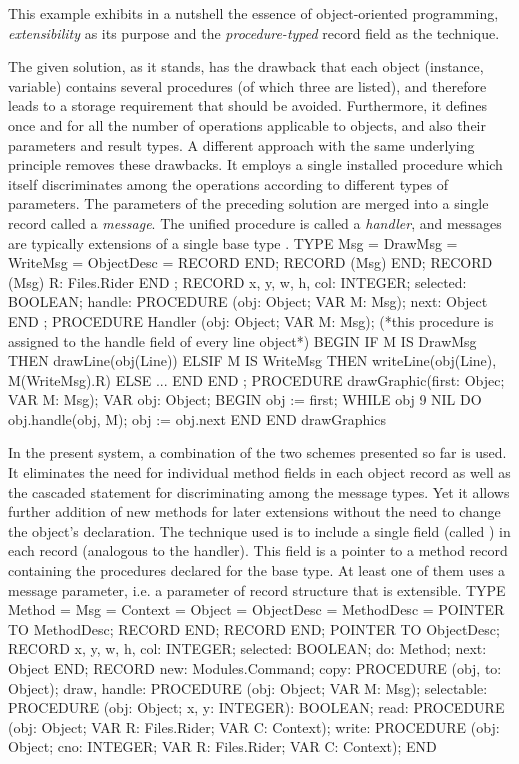 This example exhibits in a nutshell the essence of object-oriented programming, \emph{extensibility} as its purpose and the \emph{procedure-typed} record field as the technique.

The given solution, as it stands, has the drawback that each object (instance, variable) contains several procedures (of which three are listed), and therefore leads to a storage requirement that should be avoided. Furthermore, it defines once and for all the number of operations applicable to objects, and also their parameters and result types. A different approach with the same underlying principle removes these drawbacks. It employs a single installed procedure which itself discriminates among the operations according to different types of parameters. The parameters of the preceding solution are merged into a single record called a \emph{message}. The unified procedure is called a \emph{handler}, and messages are typically extensions of a single base type .
\begintt
TYPE Msg = DrawMsg =
WriteMsg = ObjectDesc =
RECORD END;
RECORD (Msg) END;
RECORD (Msg) R: Files.Rider END ;
RECORD
x, y, w, h, col: INTEGER; selected: BOOLEAN;
handle: PROCEDURE (obj: Object; VAR M: Msg);
next: Object END ;
PROCEDURE Handler (obj: Object; VAR M: Msg);
(*this procedure is assigned to the handle field of every line object*)
BEGIN
IF M IS DrawMsg THEN drawLine(obj(Line))
ELSIF M IS WriteMsg THEN writeLine(obj(Line), M(WriteMsg).R) ELSE ...
END
END ;
PROCEDURE drawGraphic(first: Objec; VAR M: Msg); VAR obj: Object;
BEGIN obj := first;
WHILE obj 9 NIL DO obj.handle(obj, M); obj := obj.next END
END drawGraphics
\endtt

In the present system, a combination of the two schemes presented so far is used. It eliminates the need for individual method fields in each object record as well as the cascaded  statement for discriminating among the message types. Yet it allows further addition of new methods for later extensions without the need to change the object's declaration. The technique used is to include a single field (called ) in each record (analogous to the handler). This field is a pointer to a method record containing the procedures declared for the base type. At least one of them uses a message parameter, i.e. a parameter of record structure that is extensible.
\begintt
TYPE Method = Msg =
Context =
Object = ObjectDesc =
MethodDesc =
POINTER TO MethodDesc; RECORD END;
RECORD END;
POINTER TO ObjectDesc; RECORD
x, y, w, h, col: INTEGER; selected: BOOLEAN;
do: Method; next: Object END;
RECORD
new: Modules.Command;
copy: PROCEDURE (obj, to: Object);
draw, handle: PROCEDURE (obj: Object; VAR M: Msg);
selectable: PROCEDURE (obj: Object; x, y: INTEGER): BOOLEAN; read: PROCEDURE (obj: Object; VAR R: Files.Rider; VAR C: Context); write: PROCEDURE (obj: Object; cno: INTEGER;
VAR R: Files.Rider; VAR C: Context); END
\endtt


